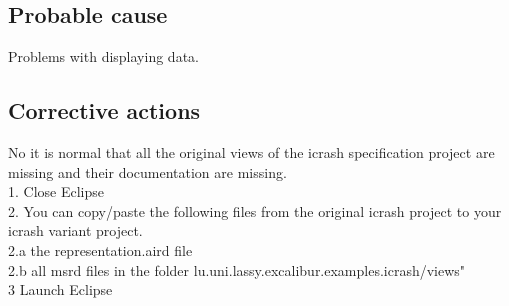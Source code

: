 \subsection{Probable cause}
Problems with displaying data.

\subsection{Corrective actions}
No it is normal that all the original views of the icrash specification project
are missing and their documentation are missing.\\
1. Close Eclipse\\
2. You can copy/paste the following files from the original icrash project to
your icrash variant project.\\
2.a the representation.aird file\\
2.b all msrd files in the folder lu.uni.lassy.excalibur.examples.icrash/views"\\
3 Launch Eclipse\\

